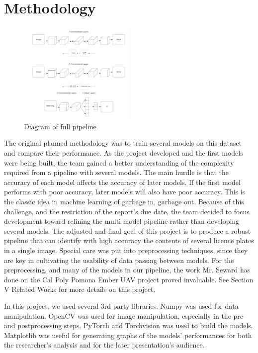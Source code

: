 \documentclass[conference]{IEEEtran}
\begin{document}
\section{Methodology}
\begin{figure}[h]
   \centering
   \includegraphics[width=0.5\textwidth]{layers.png}
   \caption{Diagram of full pipeline}
   \label{fig:image_label}
\end{figure}
The original planned methodology was to train several models on this dataset and compare their performance. As the project developed and the first models were being built, the team gained a better understanding of the complexity required from a pipeline with several models. The main hurdle is that the accuracy of each model affects the accuracy of later models. If the first model performs with poor accuracy, later models will also have poor accuracy. This is the classic idea in machine learning of garbage in, garbage out. Because of this challenge, and the restriction of the report's due date, the team decided to focus development toward refining the multi-model pipeline rather than developing several models. The adjusted and final goal of this project is to produce a robust pipeline that can identify with high accuracy the contents of several licence plates in a single image. Special care was put into preprocessing techniques, since they are key in cultivating the usability of data passing between models. For the preprocessing, and many of the models in our pipeline, the work Mr. Seward has done on the Cal Poly Pomona Ember UAV project proved invaluable. See Section V Related Works for more details on this project. 
\par
In this project, we used several 3rd party libraries. Numpy was used for data manipulation. OpenCV was used for image manipulation, especially in the pre and postprocessing steps. PyTorch and Torchvision was used to build the models. Matplotlib was useful for generating graphs of the models' performances for both the researcher's analysis and for the later presentation's audience.
\end{document}
